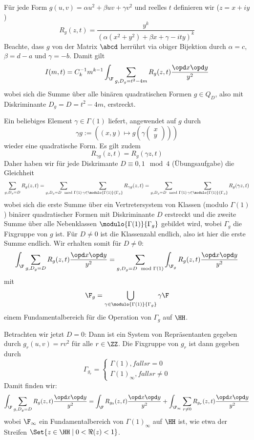 \begin{bewe}
Für jede Form $g(u, v) = \alpha u^2 + \beta uv + \gamma v^2$ und reelles $t$ definieren wir ($z = x + iy$)
\[
	R_g(z,t) = \frac {y^k} {\left( \alpha(x^2 + y^2) + \beta x + \gamma - ity \right)^k}
\]
Beachte, dass $g$ von der Matrix $\abcd$ herrührt via obiger Bijektion durch $\alpha = c$, $\beta = d - a$ und $\gamma = -b$. Damit gilt
\[
	I(m, t) = C_k^{-1} m^{k-1} \int_\F \sum_{g, D_g = t^2 - 4m} R_g(z,t) \frac {\opd x \opd y}{y^2}
\]
wobei sich die Summe über alle binären quadratischen Formen $g \in Q_D$, also mit Diskriminante $D_g = D = t^2 - 4m$, erstreckt.

Ein beliebiges Element $\gamma \in \Gamma(1)$ liefert, angewendet auf $g$ durch
\[
	\gamma g := \left( (x,y) \mapsto g(\gamma \begin{pmatrix}x\\y\end{pmatrix}) \right)
\]
wieder eine quadratische Form. Es gilt zudem
\[
	R_{\gamma g} (z, t) = R_g (\gamma z, t)
\]
Daher haben wir für jede Diskrimante $D \equiv 0, 1 \mod 4$ (Übungsaufgabe) die Gleichheit
\[
	\sum_{g, D_g = D} R_g (z, t) = \sum_{g, D_g = D \mod \Gamma(1)} \sum_{\gamma \in \modulo {\Gamma(1)} {\Gamma_g}} R_{\gamma g} (z,t) = \sum_{g, D_g = D \mod \Gamma(1)} \sum_{\gamma \in \modulo {\Gamma(1)} {\Gamma_g}} R_g (\gamma z,t)
\]
wobei sich die erste Summe über ein Vertretersystem von Klassen (modulo $\Gamma(1)$) binärer quadratischer Formen mit Diskriminante $D$ erstreckt und die zweite Summe über alle Nebenklassen $\modulo {\Gamma(1)}{\Gamma_g}$ gebildet wird, wobei $\Gamma_g$ die Fixgruppe von $g$ ist. Für $D \neq 0$ ist die Klassenzahl endlich, also ist hier die erste Summe endlich. Wir erhalten somit für $D \neq 0$:
\[
	\int_\F \sum_{g, D_g = D} R_g(z,t) \frac{\opd x \opd y}{y^2} = \sum_{g, D_g = D \mod \Gamma(1)} \int_{\F_g} R_g (z,t) \frac{\opd x \opd y}{y^2}
\]
mit 
\[
	\F_g = \bigcup_{\gamma \in \modulo {\Gamma(1)}{\Gamma_g}} \gamma \F
\]
einem Fundamentalbereich für die Operation von $\Gamma_g$ auf $\HH$.

Betrachten wir jetzt $D = 0$: Dann ist ein System von Repräsentanten gegeben durch $g_r(u,v) = rv^2$ für alle $r \in \ZZ$. Die Fixgruppe von $g_r$ ist dann gegeben durch
\[
	\Gamma_{g_r} = \begin{cases} \Gamma(1), falls r = 0\\ \Gamma(1)_\infty, falls r \neq 0\end{cases}
\]
Damit finden wir:
\begin{align*}
\int_\F \sum_{g, D_g = D} R_g(z,t) \frac{\opd x \opd y}{y^2} = \int_\F R_{g_0} (z,t) \frac{\opd x \opd y}{y^2} + \int_{\F_\infty} \sum_{r \neq 0} R_{g_r}(z,t) \frac{\opd x \opd y}{y^2}
\end{align*}
wobei $\F_\infty$ ein Fundamentalbereich von $\Gamma(1)_\infty$ auf $\HH$ ist, wie etwa der Streifen $\Set {z \in \HH \mid 0 < \Re (z) < 1}$.

\end{bewe}